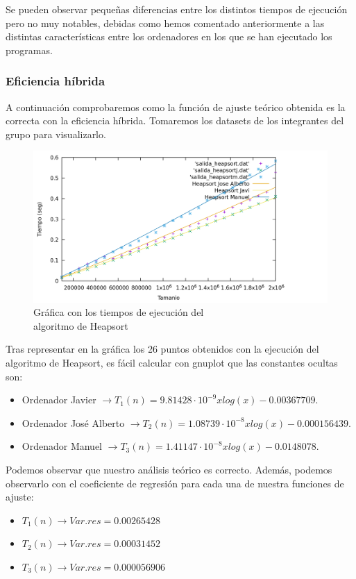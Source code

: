 \documentclass[10pt,a4paper]{article}
\begin{document}
Se pueden observar pequeñas diferencias entre los distintos tiempos de ejecución pero no muy notables, debidas como hemos comentado anteriormente a las distintas características entre los ordenadores en los que se han ejecutado los programas.

\subsubsection{Eficiencia híbrida}
A continuación comprobaremos como la función de ajuste teórico obtenida es la correcta con la eficiencia híbrida. Tomaremos los datasets de los integrantes del grupo para visualizarlo. \\

\begin{figure}[h!]
\centering
\includegraphics[scale=0.15]{../../Images/Heapsort_combinados.png}
\caption{Gráfica con los tiempos de ejecución del \\algoritmo de Heapsort}
\end{figure}

Tras representar en la gráfica los 26 puntos obtenidos con la ejecución del algoritmo de Heapsort, es fácil calcular con gnuplot que las constantes ocultas son:
\begin{itemize}
	\item Ordenador Javier \(\rightarrow T_1(n) = 9.81428 \cdot 10^{-9} xlog(x) - 0.00367709\). 
	\item Ordenador José Alberto \(\rightarrow T_2(n) = 1.08739 \cdot 10^{-8} xlog(x) - 0.000156439\).
	\item Ordenador Manuel \(\rightarrow T_3(n) = 1.41147 \cdot 10^{-8} xlog(x) - 0.0148078\).
\end{itemize} 

Podemos observar que nuestro análisis teórico es correcto. Además, podemos observarlo con el coeficiente de regresión para cada una de nuestra funciones de ajuste:
\begin{itemize}
	\item \(T_1(n) \longrightarrow Var.res = 0.00265428\)
	\item \(T_2(n) \longrightarrow Var.res = 0.00031452\)
	\item \(T_3(n) \longrightarrow Var.res = 0.000056906\)
\end{itemize}
\end{document}
